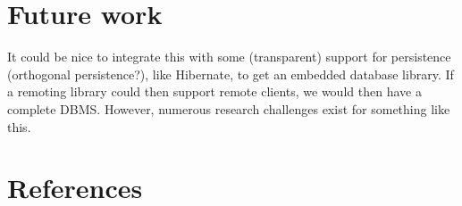 \documentclass[preprint,authoryear,10pt]{sigplanconf}
\begin{document}
\section{Future work}

It could be nice to integrate this with some (transparent) support for
persistence (orthogonal persistence?), like Hibernate, to get an
embedded database library. If a remoting library could then support
remote clients, we would then have a complete DBMS. However, numerous
research challenges exist for something like this.

\section{References}


\end{document}
